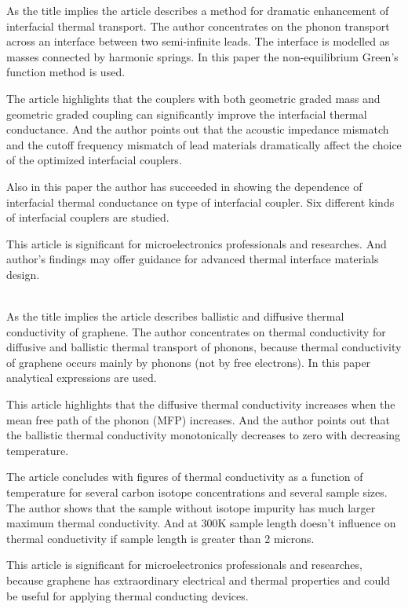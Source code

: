 \documentclass[main.tex]{subfiles}
\begin{document}
\setcounter{subsection}{6}
As the title implies the article describes a method for dramatic enhancement of interfacial thermal transport.
The author concentrates on the phonon transport across an interface between two semi-infinite leads.
The interface is modelled as masses connected by harmonic springs.
In this paper the non-equilibrium Green's function method is used.\par
The article highlights that the couplers with both geometric graded mass and geometric graded coupling can significantly improve the interfacial thermal conductance.
And the author points out that the acoustic impedance mismatch and the cutoff frequency mismatch of lead materials dramatically affect the choice of the optimized interfacial couplers.\par
Also in this paper the author has succeeded in showing the dependence of interfacial thermal conductance on type of interfacial coupler.
Six different kinds of interfacial couplers are studied.\par
This article is significant for microelectronics professionals and researches.
And author's findings may offer guidance for advanced thermal interface materials design.
\ \\\\
\newpage


\setcounter{subsection}{7}
As the title implies the article describes ballistic and diffusive thermal conductivity of graphene.
The author concentrates on thermal conductivity for diffusive and ballistic thermal transport of phonons, because thermal conductivity of graphene occurs mainly by phonons (not by free electrons).
In this paper analytical expressions are used.\par
This article highlights that the diffusive thermal conductivity increases when the mean free path of the phonon (MFP) increases.
And the author points out that the ballistic thermal conductivity monotonically decreases to zero with decreasing temperature.\par
The article concludes with figures of thermal conductivity as a function of temperature for several carbon isotope concentrations and several sample sizes.
The author shows that the sample without isotope impurity has much larger maximum thermal conductivity.
And at 300K sample length doesn't influence on thermal conductivity if sample length is greater than 2 microns.\par
This article is significant for microelectronics professionals and researches, because graphene has extraordinary electrical and thermal properties and could be useful for applying thermal conducting devices.
\ \\\\
\newpage
\end{document}
